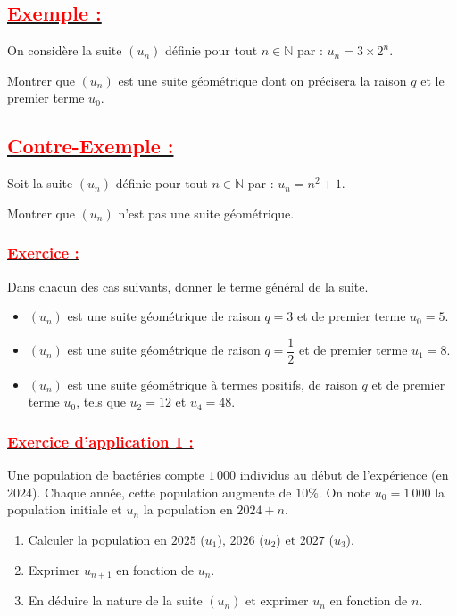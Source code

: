 \documentclass[12pt,a4paper]{article}
\begin{document}
\subsection*{\underline{\textbf{\textcolor{red}{Exemple :}}}}
On considère la suite $(u_n)$ définie pour tout $n \in \mathbb{N}$ par : $u_n = 3 \times 2^n$.

Montrer que $(u_n)$ est une suite géométrique dont on précisera la raison $q$ et le premier terme $u_0$.

\subsection*{\underline{\textbf{\textcolor{red}{Contre-Exemple :}}}}
Soit la suite $(u_n)$ définie pour tout $n \in \mathbb{N}$ par : $u_n = n^2 + 1$.

Montrer que $(u_n)$ n'est pas une suite géométrique.

\subsubsection*{\underline{\textbf{\textcolor{red}{Exercice :}}}}
Dans chacun des cas suivants, donner le terme général de la suite.
\begin{itemize}
\item[1.] $(u_n)$ est une suite géométrique de raison $q = 3$ et de premier terme $u_0 = 5$.
\item[2.] $(u_n)$ est une suite géométrique de raison $q = \dfrac{1}{2}$ et de premier terme $u_1 = 8$.
\item[3.] $(u_n)$ est une suite géométrique à termes positifs, de raison $q$ et de premier terme $u_0$, tels que $u_2 = 12$ et $u_4 = 48$.
\end{itemize}

\subsubsection*{\underline{\textbf{\textcolor{red}{Exercice d'application 1 :}}}}
Une population de bactéries compte $1\,000$ individus au début de l'expérience (en $2024$). Chaque année, cette population augmente de $10\%$. On note $u_0 = 1\,000$ la population initiale et $u_n$ la population en $2024 + n$.
\begin{enumerate}
    \item Calculer la population en $2025$ ($u_1$), $2026$ ($u_2$) et $2027$ ($u_3$).
    \item Exprimer $u_{n+1}$ en fonction de $u_n$.
    \item En déduire la nature de la suite $(u_n)$ et exprimer $u_n$ en fonction de $n$.
\end{enumerate}
\end{document}
